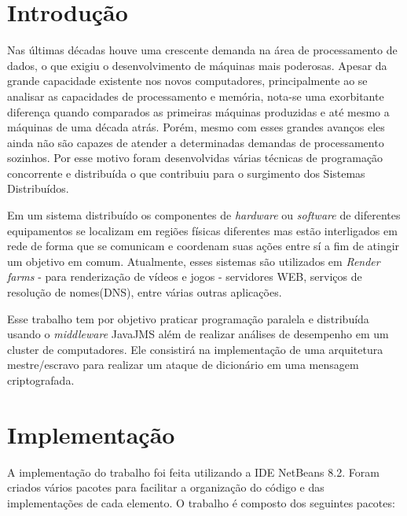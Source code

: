 \documentclass[
	12pt,				%
    oneside,			%
	a4paper,			%
	english,			%
	brazil,				%
	]{abntex2}
\begin{document}
\chapter{Introdução} 
Nas últimas décadas houve uma crescente demanda na área de processamento de dados, o que exigiu o desenvolvimento de máquinas
mais poderosas. Apesar da grande capacidade existente nos novos computadores, principalmente ao se analisar as capacidades de processamento e memória, nota-se uma exorbitante diferença quando comparados as primeiras máquinas produzidas e até mesmo a máquinas de uma década atrás. Porém, mesmo com esses grandes avanços eles ainda não são capazes de atender a determinadas demandas de processamento sozinhos. Por esse motivo foram desenvolvidas várias técnicas de programação concorrente e distribuída o que contribuiu para o surgimento dos Sistemas Distribuídos.

Em um sistema distribuído os componentes de \textit{hardware} ou \textit{software} de diferentes equipamentos se localizam em regiões físicas diferentes mas estão interligados em rede de forma que se comunicam e coordenam suas ações entre sí a fim de
atingir um objetivo em comum. Atualmente, esses sistemas são utilizados em \textit{Render farms} - para renderização de vídeos
e jogos - servidores WEB, serviços de resolução de nomes(DNS), entre várias outras aplicações.

Esse trabalho tem por objetivo praticar programação paralela e distribuída usando o \textit{middleware} JavaJMS além de 
realizar análises de desempenho em um cluster de computadores. Ele consistirá na implementação de uma arquitetura mestre/escravo para realizar um ataque de dicionário em uma mensagem criptografada.


\chapter{Implementação} 
A implementação do trabalho foi feita utilizando a IDE NetBeans 8.2. Foram criados vários pacotes para facilitar a organização 
do código e das implementações de cada elemento. O trabalho é composto dos seguintes pacotes:
\end{document}

